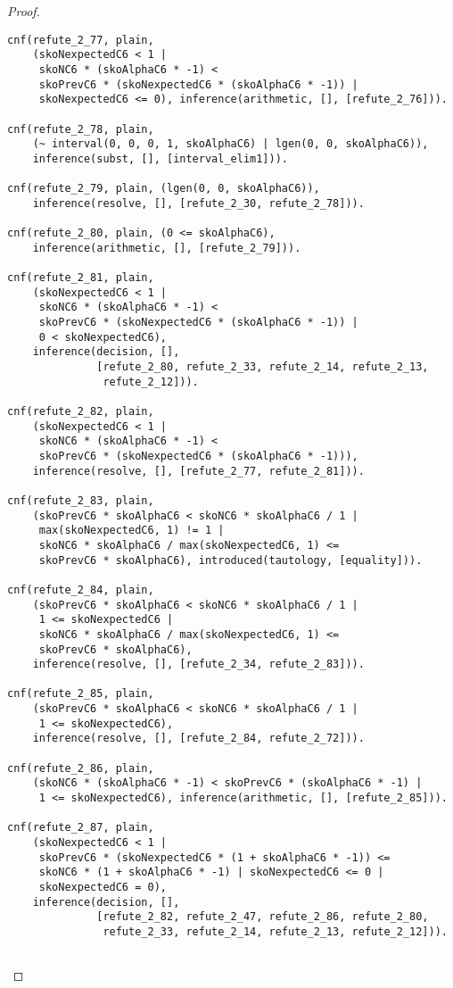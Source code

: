 \begin{proof}
\begin{verbatim}
cnf(refute_2_77, plain,
    (skoNexpectedC6 < 1 |
     skoNC6 * (skoAlphaC6 * -1) <
     skoPrevC6 * (skoNexpectedC6 * (skoAlphaC6 * -1)) |
     skoNexpectedC6 <= 0), inference(arithmetic, [], [refute_2_76])).

cnf(refute_2_78, plain,
    (~ interval(0, 0, 0, 1, skoAlphaC6) | lgen(0, 0, skoAlphaC6)),
    inference(subst, [], [interval_elim1])).

cnf(refute_2_79, plain, (lgen(0, 0, skoAlphaC6)),
    inference(resolve, [], [refute_2_30, refute_2_78])).

cnf(refute_2_80, plain, (0 <= skoAlphaC6),
    inference(arithmetic, [], [refute_2_79])).

cnf(refute_2_81, plain,
    (skoNexpectedC6 < 1 |
     skoNC6 * (skoAlphaC6 * -1) <
     skoPrevC6 * (skoNexpectedC6 * (skoAlphaC6 * -1)) |
     0 < skoNexpectedC6),
    inference(decision, [],
              [refute_2_80, refute_2_33, refute_2_14, refute_2_13,
               refute_2_12])).

cnf(refute_2_82, plain,
    (skoNexpectedC6 < 1 |
     skoNC6 * (skoAlphaC6 * -1) <
     skoPrevC6 * (skoNexpectedC6 * (skoAlphaC6 * -1))),
    inference(resolve, [], [refute_2_77, refute_2_81])).

cnf(refute_2_83, plain,
    (skoPrevC6 * skoAlphaC6 < skoNC6 * skoAlphaC6 / 1 |
     max(skoNexpectedC6, 1) != 1 |
     skoNC6 * skoAlphaC6 / max(skoNexpectedC6, 1) <=
     skoPrevC6 * skoAlphaC6), introduced(tautology, [equality])).

cnf(refute_2_84, plain,
    (skoPrevC6 * skoAlphaC6 < skoNC6 * skoAlphaC6 / 1 |
     1 <= skoNexpectedC6 |
     skoNC6 * skoAlphaC6 / max(skoNexpectedC6, 1) <=
     skoPrevC6 * skoAlphaC6),
    inference(resolve, [], [refute_2_34, refute_2_83])).

cnf(refute_2_85, plain,
    (skoPrevC6 * skoAlphaC6 < skoNC6 * skoAlphaC6 / 1 |
     1 <= skoNexpectedC6),
    inference(resolve, [], [refute_2_84, refute_2_72])).

cnf(refute_2_86, plain,
    (skoNC6 * (skoAlphaC6 * -1) < skoPrevC6 * (skoAlphaC6 * -1) |
     1 <= skoNexpectedC6), inference(arithmetic, [], [refute_2_85])).

cnf(refute_2_87, plain,
    (skoNexpectedC6 < 1 |
     skoPrevC6 * (skoNexpectedC6 * (1 + skoAlphaC6 * -1)) <=
     skoNC6 * (1 + skoAlphaC6 * -1) | skoNexpectedC6 <= 0 |
     skoNexpectedC6 = 0),
    inference(decision, [],
              [refute_2_82, refute_2_47, refute_2_86, refute_2_80,
               refute_2_33, refute_2_14, refute_2_13, refute_2_12])).


\end{verbatim}
\end{proof}
